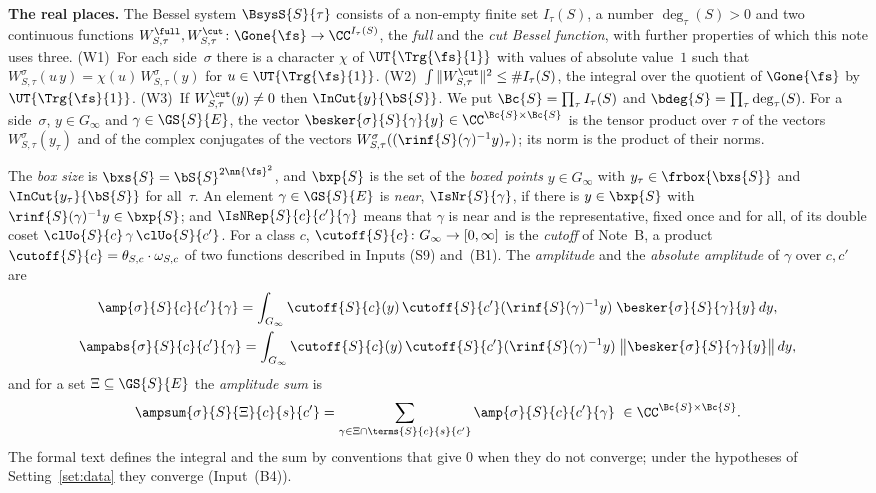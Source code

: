 \documentclass[11pt,a4paper]{article}
\newcommand{\m}[1]{\mbox{$#1$}}        %
\newcommand{\subhead}[1]{\par\addvspace{9pt plus 2pt}\Needspace{4\baselineskip}\noindent\textbf{#1}\enspace\ignorespaces}
\theoremstyle{plainx}
\theoremstyle{uprightx}
\renewcommand{\m}[1]{$#1$}
\newcommand{\sn}{\nn{\fs}}
\newcommand{\bb}{\bS{S}}
\newcommand{\ri}[1]{\rinf{S}(#1)}
\newcommand{\Ginf}{G_{\infty}}
\newcommand{\Tone}{\Trg{\fs}{1}}
\newcommand{\Uone}{\UT{\Tone}}
\newcommand{\Wt}[3]{W^{#1}_{#2,#3}}
\newcommand{\It}[2]{I_{#2}(#1)}
\newcommand{\degt}[2]{\deg_{#2}(#1)}
\newcommand{\inp}[1]{\textup{(#1)}}
\begin{document}
\subhead{The real places.} The Bessel system \m{\BsysS{S}{\tau}} consists of a non-empty finite set
\m{\It{S}{\tau}}, a number \m{\degt{S}{\tau}>0} and two continuous functions
\m{\Wt{\full}{S}{\tau},\Wt{\cut}{S}{\tau}\colon\Gone{\fs}\to\CC^{\It{S}{\tau}}}, the \emph{full} and the \emph{cut
Bessel function}, with further properties of which this note uses three. \inp{W1}~For each side~$\sigma$ there is
a character $\chi$ of \m{\Uone} with values of absolute value~$1$ such that \m{\Wt{\sigma}{S}{\tau}(u\,y)=\chi(u)\,\Wt{\sigma}{S}{\tau}(y)} for \m{u\in\Uone}.
\inp{W2}~\m{\int\|\Wt{\cut}{S}{\tau}\|^2\le\#\It{S}{\tau}}, the integral over the quotient of \m{\Gone{\fs}} by
\m{\Uone}. \inp{W3}~If \m{\Wt{\cut}{S}{\tau}(y)\ne0} then \m{\InCut{y}{\bb}}. We put \m{\Bc{S}=\prod_\tau\It{S}{\tau}}
and \m{\bdeg{S}=\prod_\tau\degt{S}{\tau}}. For a side~$\sigma$, \m{y\in\Ginf} and \m{\gamma\in\GS{S}{E}}, the
vector \m{\besker{\sigma}{S}{\gamma}{y}\in\CC^{\Bc{S}\times\Bc{S}}} is the tensor product over $\tau$ of the
vectors \m{\Wt{\sigma}{S}{\tau}(y_\tau)} and of the complex conjugates of the vectors
\m{\Wt{\sigma}{S}{\tau}((\ri{\gamma}^{-1}y)_\tau)}; its norm is the product of their norms.

The \emph{box size} is \m{\bxs{S}=\bb^{2\sn^2}}, and \m{\bxp{S}} is the set of the \emph{boxed points}
\m{y\in\Ginf} with \m{y_\tau\in\frbox{\bxs{S}}} and \m{\InCut{y_\tau}{\bb}} for all~$\tau$. An element
\m{\gamma\in\GS{S}{E}} is \emph{near}, \m{\IsNr{S}{\gamma}}, if there is \m{y\in\bxp{S}} with
\m{\ri{\gamma}^{-1}y\in\bxp{S}}; and \m{\IsNRep{S}{c}{c'}{\gamma}} means that $\gamma$ is near and is the
representative, fixed once and for all, of its double coset \m{\clUo{S}{c}\,\gamma\,\clUo{S}{c'}}. For a class $c$,
\m{\cutoff{S}{c}\colon\Ginf\to[0,\infty]} is the \emph{cutoff} of Note~B, a product
\m{\cutoff{S}{c}=\theta_{S,c}\cdot\omega_{S,c}} of two functions described in Inputs \inp{S9}
and~\inp{B1}. The \emph{amplitude} and the \emph{absolute amplitude} of $\gamma$ over \m{c,c'} are
\begin{gather*}
\amp{\sigma}{S}{c}{c'}{\gamma}=\int_{\Ginf}\cutoff{S}{c}(y)\,\cutoff{S}{c'}(\ri{\gamma}^{-1}y)\;\besker{\sigma}{S}{\gamma}{y}\,dy,\\
\ampabs{\sigma}{S}{c}{c'}{\gamma}=\int_{\Ginf}\cutoff{S}{c}(y)\,\cutoff{S}{c'}(\ri{\gamma}^{-1}y)\;\bigl\|\besker{\sigma}{S}{\gamma}{y}\bigr\|\,dy,
\end{gather*}
and for a set \m{\Xi\subseteq\GS{S}{E}} the \emph{amplitude sum} is
\[\ampsum{\sigma}{S}{\Xi}{c}{s}{c'}=\sum_{\gamma\in\Xi\cap\terms{S}{c}{s}{c'}}\amp{\sigma}{S}{c}{c'}{\gamma}\ \in\CC^{\Bc{S}\times\Bc{S}}.\]
The formal text defines the integral and the sum by conventions that give $0$ when they do not converge; under
the hypotheses of Setting~\ref{set:data} they converge (Input~\inp{B4}).
\end{document}
